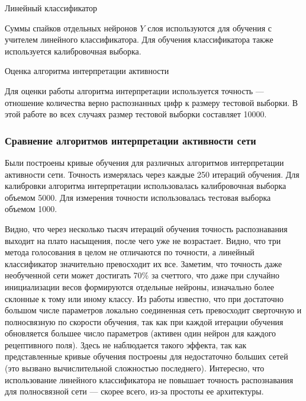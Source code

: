 \documentclass[a4paper]{article}
\begin{document}
\begin{center}
 Линейный классификатор
\end{center}
Суммы спайков отдельных нейронов $Y$ слоя используются для обучения с учителем линейного классификатора. Для обучения классификатора также используется калибровочная выборка.

\begin{center}
 Оценка алгоритма интерпретации активности
\end{center}
Для оценки работы алгоритма интерпретации используется точность --- отношение количества верно распознанных цифр к размеру тестовой выборки. В этой работе во всех случаях размер тестовой выборки составляет 10000. 

\subsubsection{Сравнение алгоритмов интерпретации активности сети}
Были построены кривые обучения для различных алгоритмов интерпретации активности сети. Точность измерялась через каждые 250 итераций обучения. Для калибровки алгоритма интерпретации использовалась калибровочная выборка объемом 5000. Для измерения точности использовалась тестовая выборка объемом 1000.

Видно, что через несколько тысяч итераций обучения точность распознавания выходит на плато насыщения, после чего уже не возрастает. Видно, что три метода голосования в целом не отличаются по точности, а линейный классификатор значительно превосходит их все. Заметим, что точность даже необученной сети может достигать 70\% за счеттого, что даже при случайно инициализации весов формируются отдельные нейроны, изначально более склонные к тому или иному классу. Из работы \cite{saunders2019locally} известно, что при достаточно большом числе параметров локально соединенная сеть превосходит сверточную и полносвязную по скорости обучения, так как при каждой итерации обучения обновляется большее число параметров (активен один нейрон для каждого рецептивного поля). Здесь не наблюдается такого эффекта, так как представленные кривые обучения построены для недостаточно больших сетей (это вызвано вычислительной сложностью последнего). Интересно, что использование линейного классификатора не повышает точность распознавания для полносвязной сети --- скорее всего, из-за простоты ее архитектуры.
\end{document}

